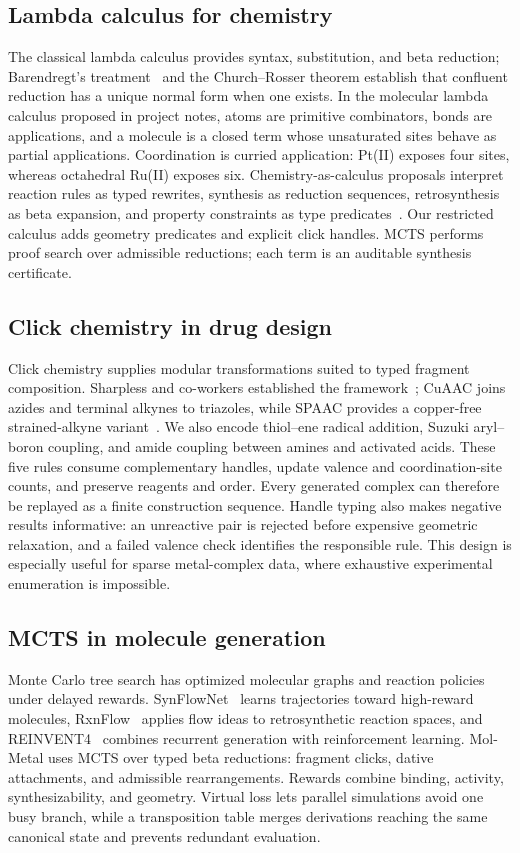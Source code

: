 \documentclass{article}
\begin{document}
\subsection{Lambda calculus for chemistry}
The classical lambda calculus provides syntax, substitution, and beta reduction; Barendregt's treatment~\cite{barendregt1984lambda} and the Church--Rosser theorem establish that confluent reduction has a unique normal form when one exists. In the molecular lambda calculus proposed in project notes, atoms are primitive combinators, bonds are applications, and a molecule is a closed term whose unsaturated sites behave as partial applications. Coordination is curried application: Pt(II) exposes four sites, whereas octahedral Ru(II) exposes six. Chemistry-as-calculus proposals interpret reaction rules as typed rewrites, synthesis as reduction sequences, retrosynthesis as beta expansion, and property constraints as type predicates~\cite{molecularLambdaNotes}. Our restricted calculus adds geometry predicates and explicit click handles. MCTS performs proof search over admissible reductions; each term is an auditable synthesis certificate.

\subsection{Click chemistry in drug design}
Click chemistry supplies modular transformations suited to typed fragment composition. Sharpless and co-workers established the framework~\cite{sharpless2001click}; CuAAC joins azides and terminal alkynes to triazoles, while SPAAC provides a copper-free strained-alkyne variant~\cite{kolb2001click}. We also encode thiol--ene radical addition, Suzuki aryl--boron coupling, and amide coupling between amines and activated acids. These five rules consume complementary handles, update valence and coordination-site counts, and preserve reagents and order. Every generated complex can therefore be replayed as a finite construction sequence. Handle typing also makes negative results informative: an unreactive pair is rejected before expensive geometric relaxation, and a failed valence check identifies the responsible rule. This design is especially useful for sparse metal-complex data, where exhaustive experimental enumeration is impossible.

\subsection{MCTS in molecule generation}
Monte Carlo tree search has optimized molecular graphs and reaction policies under delayed rewards. SynFlowNet~\cite{bengio2021flow} learns trajectories toward high-reward molecules, RxnFlow~\cite{tripp2024rxnflow} applies flow ideas to retrosynthetic reaction spaces, and REINVENT4~\cite{bou2024reinvent4} combines recurrent generation with reinforcement learning. Mol-Metal uses MCTS over typed beta reductions: fragment clicks, dative attachments, and admissible rearrangements. Rewards combine binding, activity, synthesizability, and geometry. Virtual loss lets parallel simulations avoid one busy branch, while a transposition table merges derivations reaching the same canonical state and prevents redundant evaluation.
\end{document}
